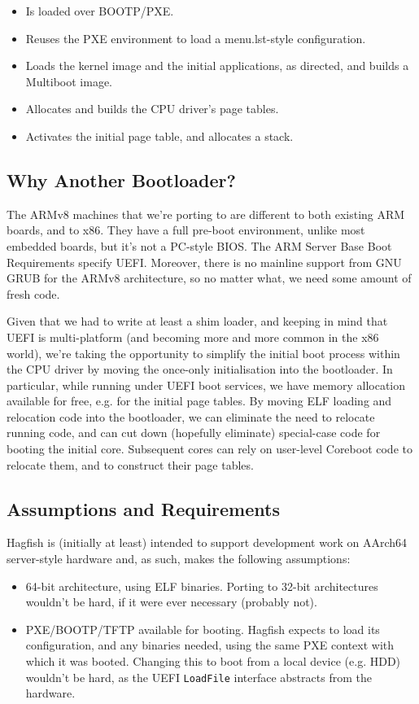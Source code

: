 \documentclass[a4paper,twoside]{report}
\begin{document}
\begin{itemize}
\item Is loaded over BOOTP/PXE.
\item Reuses the PXE environment to load a menu.lst-style configuration.
\item Loads the kernel image and the initial applications, as directed, and
builds a Multiboot image.
\item Allocates and builds the CPU driver's page tables.
\item Activates the initial page table, and allocates a stack.
\end{itemize}

\subsection{Why Another Bootloader?}

The ARMv8 machines that we're porting to are different to both existing ARM
boards, and to x86. They have a full pre-boot environment, unlike most
embedded boards, but it's not a PC-style BIOS. The ARM Server Base Boot
Requirements specify UEFI. Moreover, there is no mainline support from GNU
GRUB for the ARMv8 architecture, so no matter what, we need some amount of
fresh code.

Given that we had to write at least a shim loader, and keeping in mind that
UEFI is multi-platform (and becoming more and more common in the x86 world),
we're taking the opportunity to simplify the initial boot process within the
CPU driver by moving the once-only initialisation into the bootloader. In
particular, while running under UEFI boot services, we have memory allocation
available for free, e.g. for the initial page tables. By moving ELF loading
and relocation code into the bootloader, we can eliminate the need to relocate
running code, and can cut down (hopefully eliminate) special-case code for
booting the initial core. Subsequent cores can rely on user-level Coreboot
code to relocate them, and to construct their page tables.

\subsection{Assumptions and Requirements}

Hagfish is (initially at least) intended to support development work on
AArch64 server-style hardware and, as such, makes the following assumptions:

\begin{itemize}
\item 64-bit architecture, using ELF binaries. Porting to 32-bit architectures
wouldn't be hard, if it were ever necessary (probably not).
\item PXE/BOOTP/TFTP available for booting. Hagfish expects to load its
configuration, and any binaries needed, using the same PXE context with which
it was booted. Changing this to boot from a local device (e.g. HDD) wouldn't
be hard, as the UEFI \texttt{LoadFile} interface abstracts from the hardware.
\end{itemize}
\end{document}
